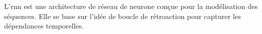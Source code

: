 \section{}
\label{seq:rnn}

L'\gls{rnn} est une architecture de réseau de neurone 
conçue pour la modélisation des séquences.
Elle se base sur l'idée de boucle de rétroaction pour capturer les dépendances temporelles.

